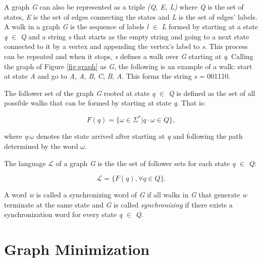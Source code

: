 {A graph \textit{G} can also be represented as a triple \textit{(Q, E, L)} where \textit{Q} is the set of states, \textit{E} is the set of edges connecting the states and \textit{L} is the set of edges' labels. A walk in a graph \textit{G} is the sequence of labels \textit{l} $\in$ \textit{L} formed by starting at a state \textit{q} $\in$ \textit{Q} and a string \textit{s} that starts as the empty string and going to a next state connected to it by a vertex and appending the vertex's label to \textit{s}. This process can be repeated and when it stops, \textit{s} defines a walk over \textit{G} starting at \textit{q}. Calling the graph of Figure \ref{fig:graph} as \textit{G}, the following is an example of a walk:  start at state \textit{A} and go to \textit{A}, \textit{A}, \textit{B}, \textit{C}, \textit{B}, \textit{A}. This forms the string \textit{s} = 001110.

\begin{definition}\label{def:followerset}
The follower set of the graph \textit{G} rooted at state \textit{q} $\in$ \textit{Q} is defined as the set of all possible walks that can be formed by starting at state \textit{q}. That is:
\end{definition}

\[ F(q) = \{\omega \in \Sigma^* | q\cdot\omega \in \textit{Q}\}, \]



\noindent where \textit{q$\cdot\omega$} denotes the state arrived after starting at \textit{q} and following the path determined by the word $\omega$.


\begin{definition}\label{def:language}
The language $\mathcal{L}$ of a graph \textit{G} is the the set of follower sets for each state \textit{q} $\in$ \textit{Q}:
\end{definition}

\[ \mathcal{L} = \{F(\textit{q}), \forall \textit{q} \in \textit{Q}\}. \]

A word \textit{w} is called a synchronizing word of \textit{G} if all walks in \textit{G} that generate \textit{w} terminate at the same state and \textit{G} is called \textit{synchronizing} if there exists a synchronization word for every state \textit{q} $\in$ \textit{Q}. 

\section{Graph Minimization}

}
